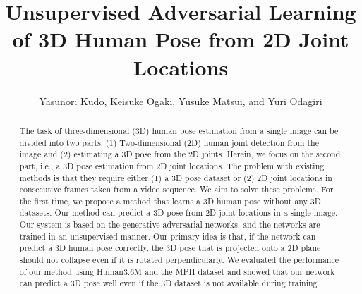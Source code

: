 \documentclass[runningheads]{llncs}
\newcommand{\matsui}[1]{\textbf{\textcolor{cyan}{[\textsc{MATSUI:} #1]}}}
\begin{document}
\pagestyle{headings}
\mainmatter
\def\ECCV18SubNumber{1654}  %

\title{Unsupervised Adversarial Learning of 3D Human Pose from 2D Joint Locations} %



\author{
Yasunori Kudo, Keisuke Ogaki, Yusuke Matsui, and Yuri Odagiri
}


\maketitle

\begin{abstract}
The task of three-dimensional (3D) human pose estimation from a single image can be divided into two parts: (1) Two-dimensional (2D) human joint detection from the image and (2) estimating a 3D pose from the 2D joints.
Herein, we focus on the second part, i.e., a 3D pose estimation from 2D joint locations.
The problem with existing methods is that they require either (1) a 3D pose dataset or (2) 2D joint locations in consecutive frames taken from a video sequence.
We aim to solve these problems.
For the first time, we propose a method that learns a 3D human pose without any 3D datasets.
Our method can predict a 3D pose from 2D joint locations in a single image.
Our system is based on the generative adversarial networks, and the networks are trained in an unsupervised manner.
Our primary idea is that, if the network can predict a 3D human pose correctly, the 3D pose that is projected onto a 2D plane should not collapse even if it is rotated perpendicularly.
We evaluated the performance of our method using Human3.6M and the MPII dataset and showed that our network can predict a 3D pose well even if the 3D dataset is not available during training.
\end{abstract}
\end{document}

